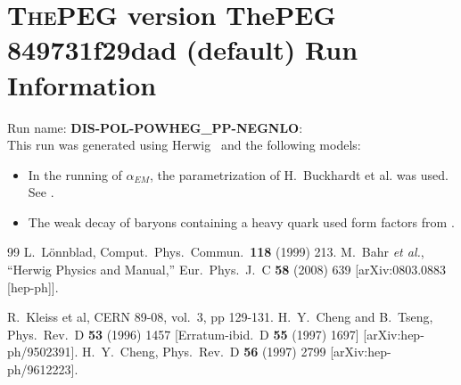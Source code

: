 \documentclass{article}
\begin{document}
\appendix
\section[xxx]{\textsc{ThePEG} version ThePEG 849731f29dad (default) \cite{ThePEG} Run Information}
Run name: \textbf{DIS-POL-POWHEG_PP-NEGNLO}:\\
This run was generated using Herwig~\cite{Bahr:2008pv} and the following models:
\begin{itemize}
\item In the running of $\alpha_{EM}$, the parametrization of H.~Buckhardt et al. was used. See \cite{KLEISSCERN9808v3pp129}.
\item The weak decay of baryons containing a heavy quark used form factors from \cite{Cheng:1995fe,Cheng:1996cs}.
\end{itemize}

\begin{thebibliography}{99}
 L.~L\"onnblad, Comput.~Phys.~Commun.\ {\bf 118} (1999) 213.
  M.~Bahr {\it et al.},
  ``Herwig Physics and Manual,''
  Eur.\ Phys.\ J.\  C {\bf 58} (2008) 639
  [arXiv:0803.0883 [hep-ph]].

 R.~Kleiss et al, CERN 89-08, vol.~3, pp 129-131.
  H.~Y.~Cheng and B.~Tseng,
  Phys.\ Rev.\  D {\bf 53} (1996) 1457
  [Erratum-ibid.\  D {\bf 55} (1997) 1697]
  [arXiv:hep-ph/9502391].
  H.~Y.~Cheng,
  Phys.\ Rev.\  D {\bf 56} (1997) 2799
  [arXiv:hep-ph/9612223].

\end{thebibliography}
\end{document}
